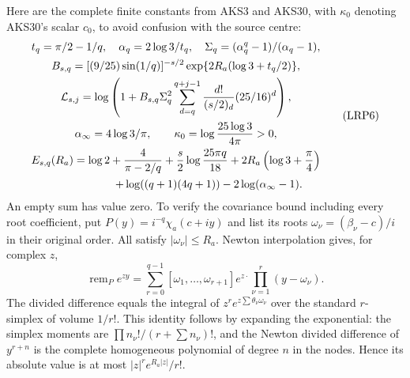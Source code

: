 \documentclass[11pt,a4paper]{article}
\begin{document}
Here are the complete finite constants from AKS3 and AKS30, with
$\kappa_0$ denoting AKS30's scalar $c_0$, to avoid confusion with the
source centre:
\[
\begin{gathered}
 t_q=\pi/2-1/q,\quad \alpha_q=2\log3/t_q,\quad
 \Sigma_q=(\alpha_q^q-1)/(\alpha_q-1),\\
 B_{s,q}=[(9/25)\sin(1/q)]^{-s/2}
           \exp\{2R_a(\log3+t_q/2)\},\\
 \mathcal L_{s,j}=
 \log\left(1+B_{s,q}\Sigma_q^2
        \sum_{d=q}^{q+j-1}\frac{d!}{(s/2)_d}(25/16)^d\right),\\
 \alpha_\infty=4\log3/\pi,\qquad
 \kappa_0=\log\frac{25\log3}{4\pi}>0,\\
 E_{s,q}(R_a)=\log2+\frac4{\pi-2/q}
       +\frac{s}{2}\log\frac{25\pi q}{18}
       +2R_a\left(\log3+\frac\pi4\right)\\
 \hspace{21mm}+\log((q+1)(4q+1))-2\log(\alpha_\infty-1).
\end{gathered}\tag{LRP6}
\]
An empty sum has value zero. To verify the covariance bound including
every root coefficient, put $P(y)=i^{-q}\chi_a(c+iy)$ and list its
roots $\omega_\nu=(\beta_\nu-c)/i$ in their original order. All satisfy
$|\omega_\nu|\le R_a$. Newton interpolation gives, for complex $z$,
\[
 \operatorname{rem}_P e^{zy}=
 \sum_{r=0}^{q-1}[\omega_1,\ldots,\omega_{r+1}]e^{z\cdot}
       \prod_{\nu=1}^{r}(y-\omega_\nu).
\]
The divided difference equals the integral of
$z^r e^{z\sum\theta_\nu\omega_\nu}$ over the standard $r$-simplex
of volume $1/r!$. This identity follows by expanding the exponential:
the simplex moments are $\prod n_\nu!/(r+\sum n_\nu)!$, and the
Newton divided difference of $y^{r+n}$ is the complete homogeneous
polynomial of degree $n$ in the nodes. Hence its absolute value is at
most $|z|^r e^{R_a|z|}/r!$.
\end{document}
